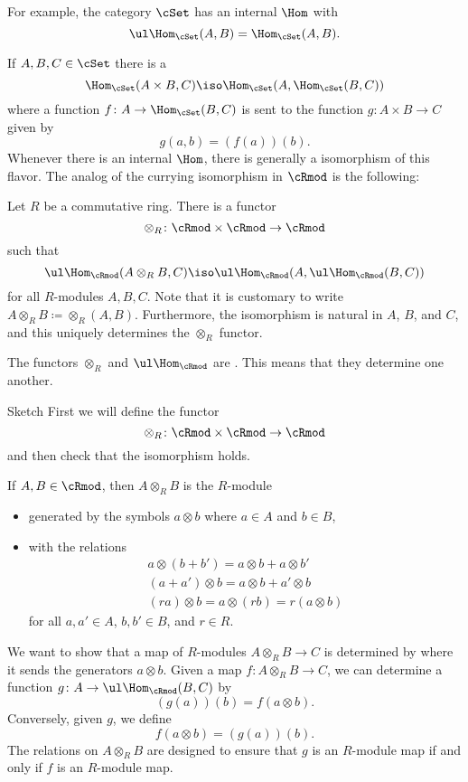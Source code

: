 \documentclass{standalone}
\begin{document}
For example, the category \(\cSet\) has an internal \(\Hom\) with
\[
  \ul\Hom_\cSet(A, B) = \Hom_\cSet(A, B).
\]

If \(A, B, C \in \cSet\) there is a 
\[
  \Hom_\cSet(A \times B, C) \iso \Hom_\cSet(A, \Hom_\cSet(B, C))
\]
where a function \(f \colon A \to \Hom_\cSet(B, C)\) is sent to the function
\(g \colon A \times B \to C\) given by
\[
  g(a, b) = (f(a))(b).
\]
Whenever there is an internal \(\Hom\), there is generally a isomorphism
of this flavor.
The analog of the currying isomorphism in \(\cRmod\) is the following:
\begin{theorem}
  Let \(R\) be a commutative ring.
  There is a functor 
  \[
    \otimes_R \colon \cRmod \times \cRmod \to \cRmod
  \]
  such that
  \[
    \ul\Hom_\cRmod(A \otimes_R B, C)
      \iso \ul\Hom_\cRmod(A, \ul\Hom_\cRmod(B, C))
  \]
  for all \(R\)-modules \(A, B, C\).
  Note that it is customary to write
  \(A \otimes_R B \coloneqq \otimes_R(A, B)\).
  Furthermore, the isomorphism is natural in \(A\), \(B\), and \(C\),
  and this uniquely determines the \(\otimes_R\) functor.
\end{theorem}

\begin{remark}
  The functors \(\otimes_R\) and \(\ul\Hom_\cRmod\) are .
  This means that they determine one another.
\end{remark}

\begin{proof*}{Sketch}
  First we will define the functor
  \[
    \otimes_R \colon \cRmod \times \cRmod \to \cRmod
  \]
  and then check that the isomorphism holds.
  \begin{definition}
    If \(A, B \in \cRmod\), then \(A \otimes_R B\) is the \(R\)-module
    \begin{itemize}[nosep]
      \item generated by the symbols \(a \otimes b\) where
            \(a \in A\) and \(b \in B\),
      \item with the relations
            \begin{gather*}
              a \otimes (b + b') = a \otimes b + a \otimes b' \\
              (a + a') \otimes b = a \otimes b + a' \otimes b \\
              (r a) \otimes b = a \otimes (r b) = r (a \otimes b)
            \end{gather*}
            for all \(a, a' \in A\), \(b, b' \in B\), and \(r \in R\).
    \end{itemize}
  \end{definition}
  
  We want to show that a map of \(R\)-modules \(A \otimes_R B \to C\)
  is determined by where it sends the generators \(a \otimes b\).
  Given a map \(f \colon A \otimes_R B \to C\), we can determine
  a function \(g \colon A \to \ul\Hom_\cRmod(B, C)\) by
  \[
    (g(a))(b) = f(a \otimes b).
  \]
  Conversely, given \(g\), we define
  \[
    f(a \otimes b) = (g(a))(b).
  \]
  The relations on \(A \otimes_R B\) are designed to ensure that \(g\) is
  an \(R\)-module map if and only if \(f\) is an \(R\)-module map.
\end{proof*}
\end{document}
